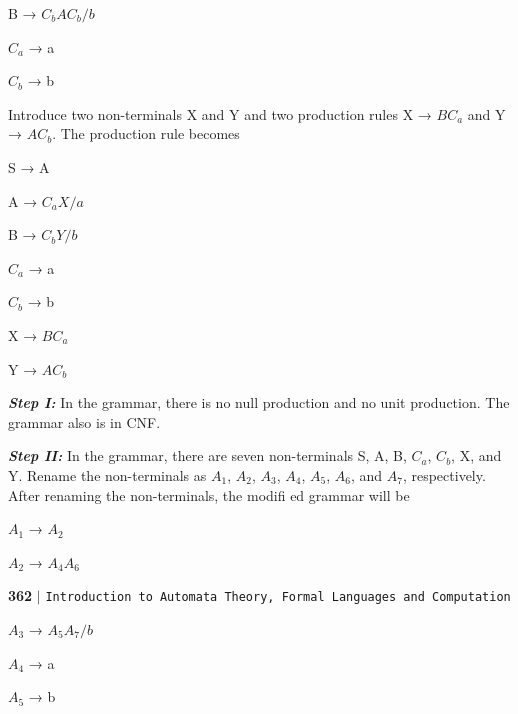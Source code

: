 \documentclass{article}
\begin{document}
\hspace*{5cm} B → $C_bAC_b/b$ 

\hspace*{5cm} $C_a$ → a 

\hspace*{5cm} $C_b$ → b 

Introduce two non-terminals X and Y and two production rules X → $BC_a$ and Y → $AC_b$. The production rule becomes 

\hspace*{5cm} S → A 

\hspace*{5cm} A → $C_aX/a$ 

\hspace*{5cm} B → $C_bY/b$

\hspace*{5cm} $C_a$ → a 

\hspace*{5cm} $C_b$ → b 

\hspace*{5cm} X → $BC_a$

\hspace*{5cm} Y → $AC_b$

\textit{\textbf{Step I:}} In the grammar, there is no null production and no unit production. The grammar also is in CNF. 

\textit{\textbf{Step II:}} In the grammar, there are seven non-terminals S, A, B, $C_a$, $C_b$, X, and Y. Rename the non-terminals as $A_1$, $A_2$, $A_3$, $A_4$, $A_5$, $A_6$, and $A_7$, respectively. After renaming the non-terminals, the modiﬁ ed grammar will be 

\hspace*{5cm} $A_1$ → $A_2$ 

\hspace*{5cm} $A_2$ → $A_4A_6$

\newpage
\begin{flushleft}
	\textbf{362}\hspace*{0.1cm} \textbf{$|$} \hspace*{0.1cm} \texttt{Introduction to Automata Theory, Formal Languages and Computation}
\end{flushleft}
\vspace*{0.5cm}

\hspace*{5cm} $A_3$ → $A_5A_7/b$ 

\hspace*{5cm} $A_4$ → a 

\hspace*{5cm} $A_5$ → b 
\end{document}
